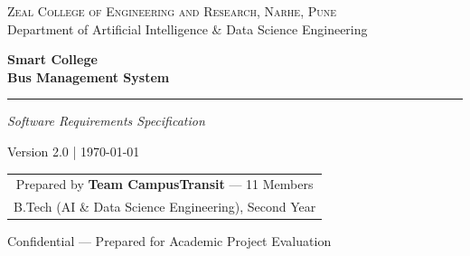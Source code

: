 \documentclass[11pt,a4paper]{report}
\begin{document}
\begin{titlepage}

\vspace*{1.6cm}
\begin{center}
{\color{white}\Large\textsc{Zeal College of Engineering and Research, Narhe, Pune}}\\[4pt]
{\color{brass}\large Department of Artificial Intelligence \& Data Science Engineering}
\end{center}

\vspace{3.4cm}

\begin{center}
{\color{pine}\fontsize{34}{40}\selectfont\bfseries Smart College\\[2pt] Bus Management System}

\vspace{0.5cm}
{\color{brass}\rule{7cm}{1.2pt}}

\vspace{0.6cm}
{\color{pinelight}\Large\itshape Software Requirements Specification}

\vspace{1.6cm}
{\color{inktext}\large Version 2.0 \quad | \quad \today}
\end{center}

\vspace{2cm}
\begin{center}
\begin{tabular}{c}
{\color{softgray}\large Prepared by \textbf{Team CampusTransit} --- 11 Members} \\[4pt]
{\color{softgray}B.Tech (AI \& Data Science Engineering), Second Year}
\end{tabular}
\end{center}

\vfill
\begin{center}
{\color{white}\small Confidential --- Prepared for Academic Project Evaluation}
\end{center}
\vspace{0.4cm}
\restoregeometry
\end{titlepage}
\end{document}
